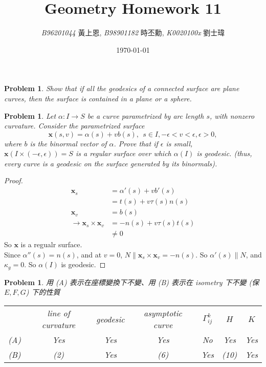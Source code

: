 \documentclass[10pt,a4paper]{article}
\newcommand{\LiHei}{\CJKfamily{lh}}
\newcounter{theProblemCounter}
\newtheorem{problem}[theProblemCounter]{Problem}
\begin{document}
\title{{Geometry Homework 11}}
\author{{\it{B96201044}} {\LiHei 黃上恩}, {\it{B98901182}} {\LiHei 時丕勳}, {\it{K0020100x}} {\LiHei 劉士瑋}}
\date{\today}
\maketitle

\newcommand{\bx}{\mathbb{X}}
\newcommand{\bfx}{\mathbf{x}}
\newcommand{\grad}{\textrm{grad }}
\newcommand{\sech}{\mbox{sech}}

\setcounter{theProblemCounter}{3}
\begin{problem} Show that if all the geodesics of a connected surface are plane curves, then the surface is contained in a plane or a sphere.
\end{problem}

\setcounter{theProblemCounter}{4}
\begin{problem} Let $\alpha: I\to S$ be a curve parametrized by arc length $s$, with nonzero curvature. Consider the parametrized surface
\[ \bfx(s, v) = \alpha(s)+vb(s), \ \ s\in I, -\epsilon<v<\epsilon, \epsilon > 0,\]
where $b$ is the binormal vector of $\alpha$. Prove that if $\epsilon$ is small, $\bfx(I\times (-\epsilon, \epsilon)) = S$ is a regular surface over which $\alpha(I)$ is geodesic. (thus, every curve is a geodesic on the surface generated by its binormals).
\end{problem}
\begin{proof}
\begin{align*}
\bfx_s&=\alpha'(s)+vb'(s)\\
&=t(s)+v\tau(s)n(s)\\
\bfx_v&=b(s)\\
\rightarrow \bfx_s\times\bfx_v&=-n(s)+v\tau(s)t(s)\\
&\neq 0
\end{align*}
So $\bfx$ is a regualr surface.\\
Since $\alpha''(s)=n(s)$, and at $v=0$, $N\parallel \bfx_s\times\bfx_v=-n(s)$. So $\alpha'(s)\parallel N$, and $\kappa_g=0$. So $\alpha(I)$ is geodesic.
\end{proof}

\setcounter{theProblemCounter}{7}
\begin{problem}
用 (A) 表示在座標變換下不變、用 (B) 表示在 isometry 下不變 (保 $E, F, G$) 下的性質

\begin{tabular}{c|c|c|c|c|c|c|}
\cline{2-7}
 & line of curvature & geodesic & asymptotic curve & $\Gamma^{k}_{ij}$ & $H$ & $K$ \\
\cline{2-7}
(A) & Yes & Yes & Yes & No & Yes & Yes\\
\cline{2-7}
(B) & (2) & Yes & (6) & Yes & (10) & Yes\\
\cline{2-7}
\end{tabular}
\end{problem}
\end{document}

